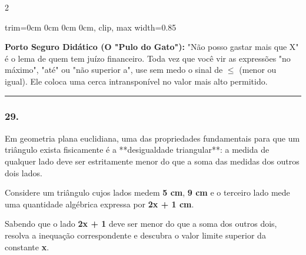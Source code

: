 \begin{multicols*}{2}
\begin{tcolorbox}[colback=CorTitUm!5, colframe=CorTitUm, boxrule=1pt, arc=4pt, left=6pt, right=6pt, top=6pt, bottom=6pt]
\begin{center}
\begin{adjustbox}{trim=0cm 0cm 0cm 0cm, clip, max width=0.85\linewidth}
    \end{adjustbox}
    \end{center}
    \end{tcolorbox}
    \vspace{0.15cm}
    
    \begin{boxexplicacao}
    \textbf{Porto Seguro Didático (O "Pulo do Gato"):} "Não posso gastar mais que X" é o lema de quem tem juízo financeiro. Toda vez que você vir as expressões "no máximo", "até" ou "não superior a", use sem medo o sinal de $\le$ (menor ou igual). Ele coloca uma cerca intransponível no valor mais alto permitido.
    \end{boxexplicacao}
\fi

\par\vspace{\espacoQuestao}


\noindent\textcolor{CorLinha}{\rule{\linewidth}{0.5pt}} 
\par\vspace{\espacoPreQuestao}
\subsubsection*{29.} 
\begin{enunciadoLiteral}
Em geometria plana euclidiana, uma das propriedades fundamentais para que um triângulo exista fisicamente é a **desigualdade triangular**: a medida de qualquer lado deve ser estritamente menor do que a soma das medidas dos outros dois lados.

Considere um triângulo cujos lados medem \textbf{5 cm}, \textbf{9 cm} e o terceiro lado mede uma quantidade algébrica expressa por \textbf{2x + 1 cm}.

Sabendo que o lado \textbf{2x + 1} deve ser menor do que a soma dos outros dois, resolva a inequação correspondente e descubra o valor limite superior da constante \textbf{x}.
\end{enunciadoLiteral}


\end{multicols*}
